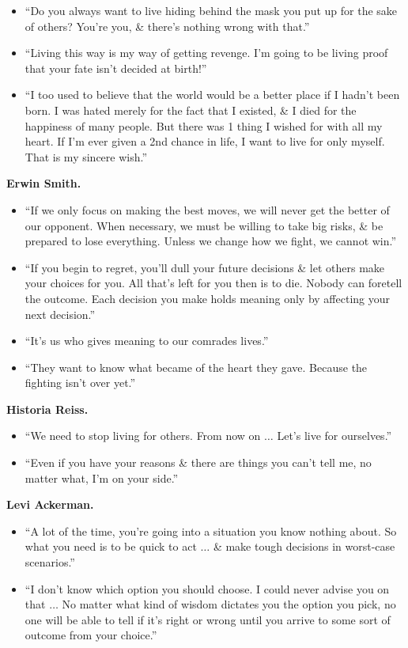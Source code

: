 \documentclass{article}
\begin{document}
\begin{enumerate}
\begin{itemize}
		\item ``Do you always want to live hiding behind the mask you put up for the sake of others? You're you, \& there's nothing wrong with that.''
		\item ``Living this way is my way of getting revenge. I'm going to be living proof that your fate isn't decided at birth!''
		\item ``I too used to believe that the world would be a better place if I hadn't been born. I was hated merely for the fact that I existed, \& I died for the happiness of many people. But there was 1 thing I wished for with all my heart. If I'm ever given a 2nd chance in life, I want to live for only myself. That is my sincere wish.''
	\end{itemize}
	{\bf Erwin Smith.}
	\begin{itemize}
		\item ``If we only focus on making the best moves, we will never get the better of our opponent. When necessary, we must be willing to take big risks, \& be prepared to lose everything. Unless we change how we fight, we cannot win.''
		\item ``If you begin to regret, you'll dull your future decisions \& let others make your choices for you. All that's left for you then is to die. Nobody can foretell the outcome. Each decision you make holds meaning only by affecting your next decision.''
		\item ``It's us who gives meaning to our comrades lives.''
		\item ``They want to know what became of the heart they gave. Because the fighting isn't over yet.''
	\end{itemize}
	{\bf Historia Reiss.}
	\begin{itemize}
		\item ``We need to stop living for others. From now on $\ldots$ Let's live for ourselves.''
		\item ``Even if you have your reasons \& there are things you can't tell me, no matter what, I'm on your side.''
	\end{itemize}
	{\bf Levi Ackerman.}
	\begin{itemize}
		\item ``A lot of the time, you're going into a situation you know nothing about. So what you need is to be quick to act $\ldots$ \& make tough decisions in worst-case scenarios.''
		\item ``I don't know which option you should choose. I could never advise you on that $\ldots$ No matter what kind of wisdom dictates you the option you pick, no one will be able to tell if it's right or wrong until you arrive to some sort of outcome from your choice.''

\end{itemize}
\end{enumerate}
\end{document}
